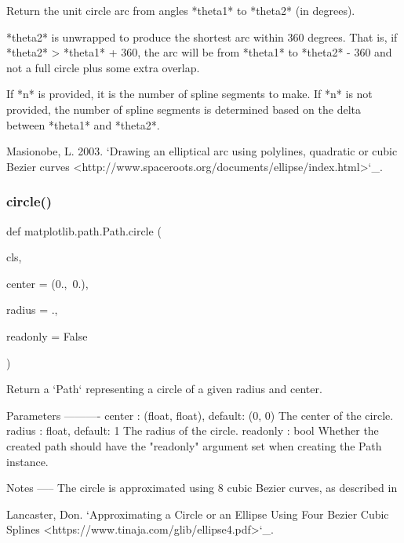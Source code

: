 \begin{DoxyVerb}Return the unit circle arc from angles *theta1* to *theta2* (in
degrees).

*theta2* is unwrapped to produce the shortest arc within 360 degrees.
That is, if *theta2* > *theta1* + 360, the arc will be from *theta1* to
*theta2* - 360 and not a full circle plus some extra overlap.

If *n* is provided, it is the number of spline segments to make.
If *n* is not provided, the number of spline segments is
determined based on the delta between *theta1* and *theta2*.

   Masionobe, L.  2003.  `Drawing an elliptical arc using
   polylines, quadratic or cubic Bezier curves
   <http://www.spaceroots.org/documents/ellipse/index.html>`_.
\end{DoxyVerb}
 \mbox{\label{classmatplotlib_1_1path_1_1Path_a2e8e8b67f94962b815605930f7a79789}} 
\subsubsection{\texorpdfstring{circle()}{circle()}}
{\footnotesize\ttfamily def matplotlib.\+path.\+Path.\+circle (\begin{DoxyParamCaption}\item[{}]{cls,  }\item[{}]{center = {\ttfamily (0.,~0.)},  }\item[{}]{radius = {.},  }\item[{}]{readonly = {\ttfamily False} }\end{DoxyParamCaption})}

\begin{DoxyVerb}Return a `Path` representing a circle of a given radius and center.

Parameters
----------
center : (float, float), default: (0, 0)
    The center of the circle.
radius : float, default: 1
    The radius of the circle.
readonly : bool
    Whether the created path should have the "readonly" argument
    set when creating the Path instance.

Notes
-----
The circle is approximated using 8 cubic Bezier curves, as described in

  Lancaster, Don.  `Approximating a Circle or an Ellipse Using Four
  Bezier Cubic Splines <https://www.tinaja.com/glib/ellipse4.pdf>`_.
\end{DoxyVerb}
 \mbox{\label{classmatplotlib_1_1path_1_1Path_abce61e4078ff3c4d78f453cfa2295330}} 
